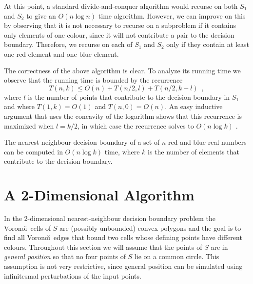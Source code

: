 \documentclass[lotsofwhite,charterfonts]{patmorin}
\newcommand{\voronoi}{Vorono\u\i}
\begin{document}
At this point, a standard divide-and-conquer algorithm would recurse
on both $S_1$ and $S_2$ to give an $O(n\log n)$ time algorithm.
However, we can improve on this by observing that it is not necessary
to recurse on a subproblem if it contains only elements of one colour,
since it will not contribute a pair to the decision boundary.
Therefore, we recurse on each of $S_1$ and $S_2$ only if they contain
at least one red element and one blue element.

The correctness of the above algorithm is clear.  To analyze its
running time we observe that the running time is bounded by the
recurrence
\[
   T(n,k) \le O(n) + T\left(n/2,l\right) 
   	+ T\left(n/2,k-l\right) \enspace
  , 
\]
where $l$ is the number of points that contribute to the decision
boundary in  $S_1$ and where $T(1,k)=O(1)$ and $T(n,0)=O(n)$.  An
easy inductive argument that uses the concavity of the logarithm shows
that this recurrence is maximized when $l=k/2$, in which case the
recurrence solves to $O(n\log k)$ \cite{csy97}.

\begin{thm}
The nearest-neighbour decision boundary of a set of $n$ red and blue
real numbers can be computed in $O(n\log k)$ time, where $k$ is the
number of elements that contribute to the decision boundary.
\end{thm}



\section{A 2-Dimensional Algorithm}

In the 2-dimensional nearest-neighbour decision boundary problem the
\voronoi\ cells of $S$ are (possibly unbounded) convex polygons and
the goal is to find all \voronoi\ edges that bound two cells whose
defining points have different colours.  Throughout this section we
will assume that the points of $S$ are in \emph{general position} so
that no four points of $S$ lie on a common circle.  This assumption is
not very restrictive, since general position can be simulated using
infinitesmal perturbations of the input points.
\end{document}
